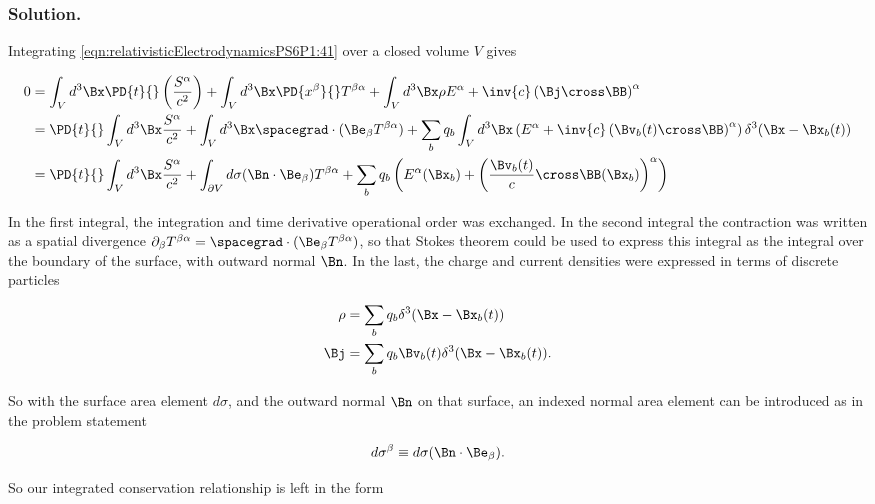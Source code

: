 \subsubsection{Solution.}

Integrating \ref{eqn:relativisticElectrodynamicsPS6P1:41} over a closed volume $V$ gives

\begin{align*}
0 
&=
\int_V d^3 \Bx \PD{t}{}\left( \frac{S^\alpha}{c^2} \right) 
+ 
\int_V d^3 \Bx \PD{x^\beta}{} T^{\beta \alpha} 
+
\int_V d^3 \Bx \rho E^\alpha + \inv{c} \left( \Bj \cross \BB \right)^\alpha  \\
&=
\PD{t}{} \int_V d^3 \Bx \frac{S^\alpha}{c^2} 
+ 
\int_V d^3 \Bx \spacegrad \cdot (\Be_\beta T^{\beta \alpha})
+
\sum_b q_b \int_V d^3 \Bx \left( E^\alpha + \inv{c} \left( \Bv_b(t) \cross \BB \right)^\alpha \right) \delta^3(\Bx - \Bx_b(t)) \\
&=
\PD{t}{} \int_V d^3 \Bx \frac{S^\alpha}{c^2} 
+ 
\int_{\partial V} d \sigma (\Bn \cdot \Be_\beta) T^{\beta \alpha}
+
\sum_b q_b \left( E^\alpha(\Bx_b) + \left( \frac{\Bv_b(t)}{c} \cross \BB(\Bx_b) \right)^\alpha \right)
\end{align*}

In the first integral, the integration and time derivative operational order was exchanged.  In the second integral the contraction was written as a spatial divergence $\partial_\beta T^{\beta \alpha} = \spacegrad \cdot (\Be_\beta T^{\beta \alpha})$, so that Stokes theorem could be used to express this integral as the integral over the boundary of the surface, with outward normal $\Bn$.  In the last, the charge and current densities were expressed in terms of discrete particles

\begin{align}\label{eqn:relativisticElectrodynamicsPS6P1:230}
\rho &= \sum_b q_b \delta^3(\Bx - \Bx_b(t)) \\
\Bj &= \sum_b q_b \Bv_b(t) \delta^3(\Bx - \Bx_b(t)).
\end{align}

So with the surface area element $d \sigma$, and the outward normal $\Bn$ on that surface, an indexed normal area element can be introduced as in the problem statement

\begin{equation}\label{eqn:relativisticElectrodynamicsPS6P1:250}
d \sigma^\beta \equiv d \sigma (\Bn \cdot \Be_\beta).
\end{equation}

So our integrated conservation relationship is left in the form

